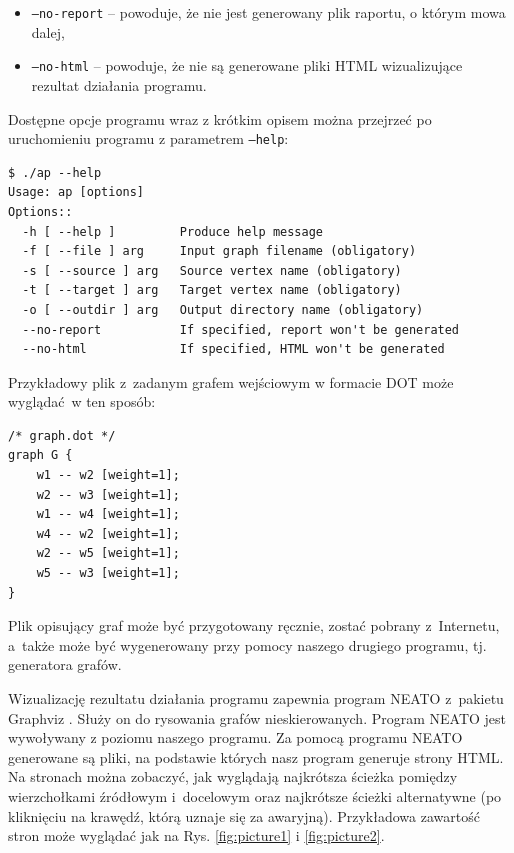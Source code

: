 \documentclass[a4paper, 12pt]{article}
\begin{document}
\begin{itemize}
\item \texttt{--no-report} -- powoduje, że nie jest generowany plik raportu, o którym mowa dalej,
\item \texttt{--no-html} -- powoduje, że nie są generowane pliki HTML wizualizujące rezultat działania programu.
\end{itemize}

Dostępne opcje programu wraz z krótkim opisem można przejrzeć po uruchomieniu programu z parametrem \texttt{--help}:

\begin{verbatim}
$ ./ap --help
Usage: ap [options]
Options::
  -h [ --help ]         Produce help message
  -f [ --file ] arg     Input graph filename (obligatory)
  -s [ --source ] arg   Source vertex name (obligatory)
  -t [ --target ] arg   Target vertex name (obligatory)
  -o [ --outdir ] arg   Output directory name (obligatory)
  --no-report           If specified, report won't be generated
  --no-html             If specified, HTML won't be generated
\end{verbatim}

Przykładowy plik z~zadanym grafem wejściowym w formacie DOT może wyglądać~w ten sposób:

\begin{verbatim}
/* graph.dot */
graph G {
	w1 -- w2 [weight=1];
	w2 -- w3 [weight=1];
	w1 -- w4 [weight=1];
	w4 -- w2 [weight=1];
	w2 -- w5 [weight=1];
	w5 -- w3 [weight=1];
}
\end{verbatim}

Plik opisujący graf może być przygotowany ręcznie, zostać pobrany z~Internetu, a~także może być wygenerowany przy pomocy naszego drugiego programu, tj. generatora grafów.

Wizualizację rezultatu działania programu zapewnia program NEATO z~pakietu Graphviz \cite{gv}. Służy on do rysowania grafów nieskierowanych. Program NEATO jest wywoływany z poziomu naszego programu. Za pomocą programu NEATO generowane są pliki, na podstawie których nasz program generuje strony HTML. Na stronach można zobaczyć, jak wyglądają najkrótsza ścieżka pomiędzy wierzchołkami źródłowym i~docelowym oraz najkrótsze ścieżki alternatywne (po kliknięciu na krawędź, którą uznaje się za awaryjną). Przykładowa zawartość stron może wyglądać jak na Rys. \ref{fig:picture1} i \ref{fig:picture2}.
\end{document}
